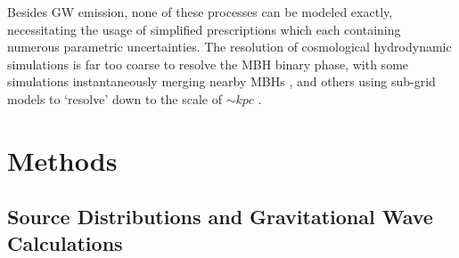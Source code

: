 \documentclass[useAMS, usenatbib]{mnras}
\begin{document}
    Besides GW emission, none of these processes can be modeled exactly, necessitating the usage of simplified prescriptions which each containing numerous parametric uncertainties.  The resolution of cosmological hydrodynamic simulations is far too coarse to resolve the MBH binary phase, with some simulations instantaneously merging nearby MBHs , and others using sub-grid models to `resolve' down to the scale of $\sim kpc$ .






\section{Methods}
    \label{sec:meth}

    \subsection{Source Distributions and Gravitational Wave Calculations}
\end{document}
